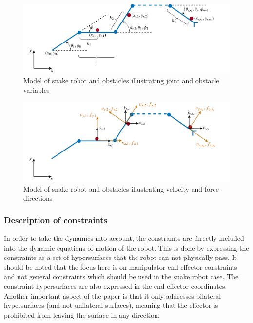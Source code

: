 \begin{figure}
    \centering
    \includegraphics[width=\textwidth]{figures/theory/dhpfc_robot.pdf}
    \caption{Model of snake robot and obstacles illustrating joint and obstacle variables}
    \label{fig:dhpfc_robot1}
\end{figure}
\begin{figure}
    \centering
    \includegraphics[width=\textwidth]{figures/theory/dhpfc_robot_2.pdf}
    \caption{Model of snake robot and obstacles illustrating velocity and force directions}
    \label{fig:dhpfc_robot2}
\end{figure}

\subsubsection{Description of constraints}

In order to take the dynamics into account, the constraints are directly included into the dynamic equations of motion of the robot. This is done by expressing the constraints as a set of hypersurfaces that the robot can not physically pass. It should be noted that the focus here is on manipulator end-effector constraints and not general constraints which should be used in the snake robot case. The constraint hypersurfaces are also expressed in the end-effector coordinates. Another important aspect of the paper is that it only addresses bilateral hypersurfaces (and not unilateral surfaces), meaning that the effector is prohibited from leaving the surface in any direction.

